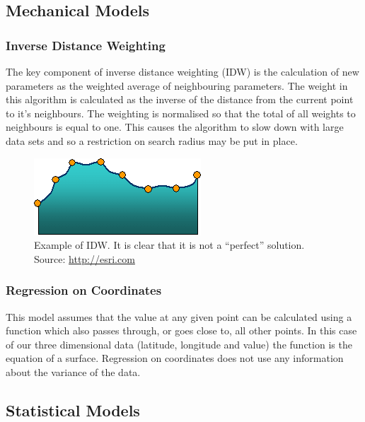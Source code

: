 

\subsection{Mechanical Models}\label{mechanicalmodels}

\subsubsection{Inverse Distance Weighting}\label{inverseweight}

The key component of inverse distance weighting (IDW) is the calculation of new parameters as the weighted average of neighbouring parameters. The weight in this algorithm is calculated as the inverse of the distance from the current point to it's neighbours. The weighting is normalised so that the total of all weights to neighbours is equal to one. This causes the algorithm to slow down with large data sets and so a restriction on search radius may be put in place. 

\begin{figure}[H]
	\begin{center}
        \includegraphics[scale=0.5]{./images/mpp1/IDW.png}
        \caption{Example of IDW. It is clear that it is not a ``perfect'' solution. Source: \url{http://esri.com}}
        \label{fig:idw}
	\end{center}
\end{figure}

\subsubsection{Regression on Coordinates}\label{regressiononcoordinates}

This model assumes that the value at any given point can be calculated using a function which also passes through, or goes close to, all other points. In this case of our three dimensional data (latitude, longitude and value) the function is the equation of a surface. Regression on coordinates does not use any information about the variance of the data. 

\subsection{Statistical Models}\label{statisticalmodels}

